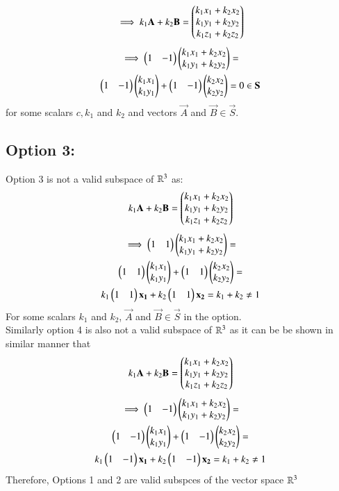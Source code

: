 \documentclass[journal,12pt,twocolumn]{IEEEtran}
\begin{document}
\begin{align}
  \implies   k_1\mathbf{A} + k_2\mathbf{B} = \begin{pmatrix}k_1x_1 + k_2x_2 \\ k_1y_1 + k_2y_2 \\ k_1z_1 + k_2z_2\end{pmatrix}
\end{align}
\begin{multline}
    \implies \begin{pmatrix}1 & -1\end{pmatrix}\begin{pmatrix}k_1x_1 + k_2x_2 \\ k_1y_1 + k_2y_2\end{pmatrix} = \\
    \begin{pmatrix}1 & -1\end{pmatrix}\begin{pmatrix}k_1x_1 \\  k_1y_1\end{pmatrix} + \begin{pmatrix}1 & -1\end{pmatrix}\begin{pmatrix}k_2x_2 \\  k_2y_2\end{pmatrix} = 0\in \mathbf{S}
\end{multline} for some scalars $c, k_1$ and $k_2$ and vectors $\vec{A}$ and $\vec{B} \in \vec{S}$.
\subsection{Option 3:}
Option 3 is not a valid subspace of $\mathbb{R}^3$ as:
\begin{align}
  k_1\mathbf{A} + k_2\mathbf{B} = \begin{pmatrix}k_1x_1 + k_2x_2 \\ k_1y_1 + k_2y_2 \\ k_1z_1 + k_2z_2\end{pmatrix}
\end{align}
\begin{multline}
    \implies \begin{pmatrix}1 & 1\end{pmatrix}\begin{pmatrix}k_1x_1 + k_2x_2 \\ k_1y_1 + k_2y_2\end{pmatrix} = \\
    \begin{pmatrix}1 & 1\end{pmatrix}\begin{pmatrix}k_1x_1 \\  k_1y_1\end{pmatrix} + \begin{pmatrix}1 & 1\end{pmatrix}\begin{pmatrix}k_2x_2 \\  k_2y_2\end{pmatrix} = \\
    k_1\begin{pmatrix}1 & 1\end{pmatrix}\mathbf{x_1}+ k_2\begin{pmatrix}1 & 1\end{pmatrix}\mathbf{x_2} = k_1 + k_2 \neq 1
\end{multline}
For some scalars $k_1$ and $k_2$, $\vec{A}$ and $\vec{B} \in \vec{S}$ in the option. \\
Similarly option 4 is also not a valid subspace of $\mathbb{R}^3$ as it can be be shown in similar manner that
\begin{align}
  k_1\mathbf{A} + k_2\mathbf{B} = \begin{pmatrix}k_1x_1 + k_2x_2 \\ k_1y_1 + k_2y_2 \\ k_1z_1 + k_2z_2\end{pmatrix}
\end{align}
\begin{multline}
    \implies \begin{pmatrix}1 & -1\end{pmatrix}\begin{pmatrix}k_1x_1 + k_2x_2 \\ k_1y_1 + k_2y_2\end{pmatrix} = \\
    \begin{pmatrix}1 & -1\end{pmatrix}\begin{pmatrix}k_1x_1 \\  k_1y_1\end{pmatrix} + \begin{pmatrix}1 & -1\end{pmatrix}\begin{pmatrix}k_2x_2 \\  k_2y_2\end{pmatrix} = \\
    k_1\begin{pmatrix}1 & -1\end{pmatrix}\mathbf{x_1}+ k_2\begin{pmatrix}1 & -1\end{pmatrix}\mathbf{x_2} = k_1 + k_2 \neq 1
\end{multline}
Therefore, Options 1 and 2 are valid subspces of the vector space $\mathbb{R}^3$
\end{document}
